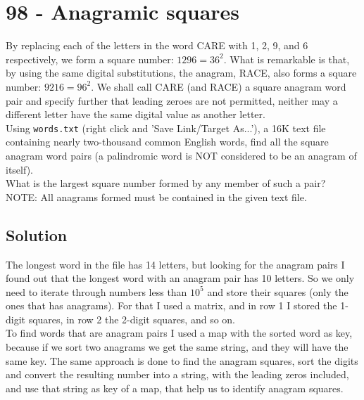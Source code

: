 \chapter*{98 - Anagramic squares}

 
By replacing each of the letters in the word CARE with 1, 2, 9, and 6 respectively, we form a square number: $1296 = 36^2$. What is remarkable is that, by using the same digital substitutions, the anagram, RACE, also forms a square number: $9216 = 96^2$. We shall call CARE (and RACE) a square anagram word pair and specify further that leading zeroes are not permitted, neither may a different letter have the same digital value as another letter.\\

Using \texttt{words.txt} (right click and 'Save Link/Target As...'), a 16K text file containing nearly two-thousand common English words, find all the square anagram word pairs (a palindromic word is NOT considered to be an anagram of itself).\\

What is the largest square number formed by any member of such a pair?\\

NOTE: All anagrams formed must be contained in the given text file.\\

\section*{Solution}

The longest word in the file has 14 letters, but looking for the anagram pairs I found out that the longest word with an anagram pair has 10 letters. So we only need to iterate through numbers less than $10^5$ and store their squares (only the ones that has anagrams). For that I used a matrix, and in row 1 I stored the 1-digit squares, in row 2 the 2-digit squares, and so on.\\

To find words that are anagram pairs I used a map with the sorted word as key, because if we sort two anagrams we get the same string, and they will have the same key. The same approach is done to find the anagram squares, sort the digits and convert the resulting number into a string, with the leading zeros included, and use that string as key of a map, that help us to identify anagram squares.\\

